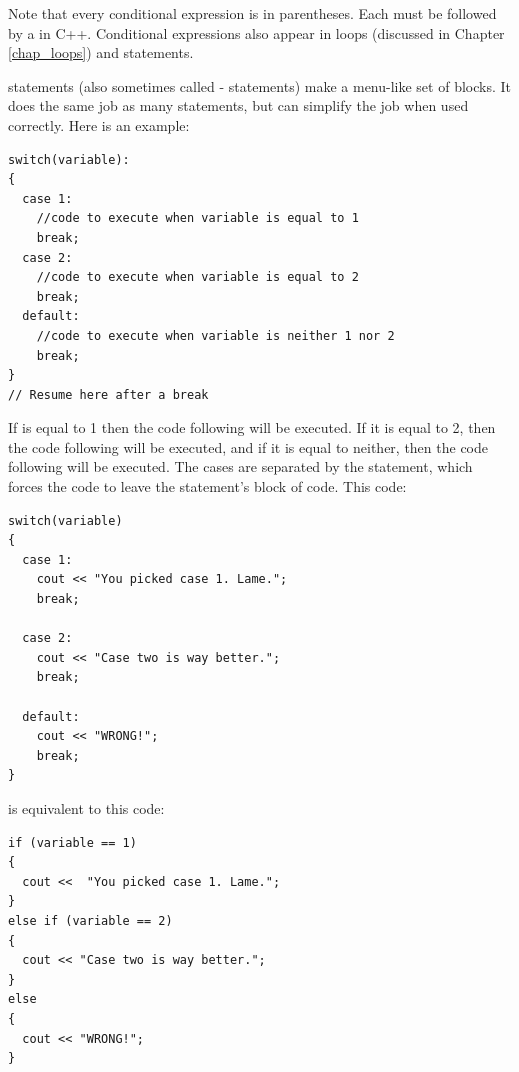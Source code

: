 Note that every conditional expression is in parentheses.
Each  must be followed by a  in C++. 
Conditional expressions also appear in loops (discussed in Chapter \ref{chap_loops}) and  statements.


 statements (also sometimes called - statements) make a menu-like set of blocks. 
It does the same job as many  statements, but can simplify the job when used correctly. 
Here is an example:

\noindent\begin{minipage}{\linewidth}\begin{lstlisting}
switch(variable):
{
  case 1:
    //code to execute when variable is equal to 1
    break;
  case 2:
    //code to execute when variable is equal to 2
    break;
  default:
    //code to execute when variable is neither 1 nor 2
    break;
}
// Resume here after a break
\end{lstlisting}\end{minipage}

If  is equal to 1 then the code following  will be executed.
If it is equal to 2, then the code following  will be executed, and if it is equal to neither, then the code following  will be executed. 
The cases are separated by the  statement, which forces the code to leave the  statement's block of code. This code: \nopagebreak[4]

\noindent\begin{minipage}{\linewidth}\begin{lstlisting}
switch(variable)
{
  case 1:
    cout << "You picked case 1. Lame.";
    break;

  case 2:
    cout << "Case two is way better.";
    break;

  default:
    cout << "WRONG!";
    break;
}
\end{lstlisting}\end{minipage}

\noindent is equivalent to this code: \nopagebreak[4]

\noindent\begin{minipage}{\linewidth}\begin{lstlisting}
if (variable == 1)
{
  cout <<  "You picked case 1. Lame.";
}
else if (variable == 2)
{
  cout << "Case two is way better.";
}
else
{
  cout << "WRONG!";
}
\end{lstlisting}\end{minipage}

